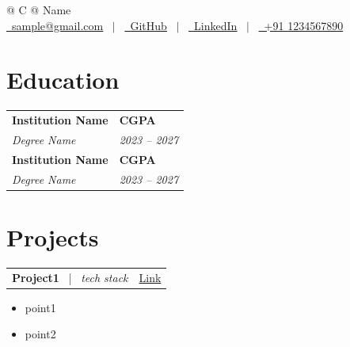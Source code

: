 \documentclass[a4paper,11pt]{article}
\begin{document}
\pagestyle{empty} 

\begin{tabularx}{\linewidth}{@{} C @{}}
\Huge{Name} \\[5pt]
\href{mailto:sample@gmail.com}{\raisebox{-0.05\height}\faEnvelope\ \underline{sample@gmail.com}} \ $|$ \
\href{https://github.com/sample}{\raisebox{-0.05\height}\faGithub\ \underline{GitHub}} \ $|$ \ 
\href{https://linkedin.com/in/sample}{\raisebox{-0.05\height}\faLinkedin\ \underline{LinkedIn}} \ $|$ \
\href{tel:+911234567890}{\raisebox{-0.05\height}\faMobile\ +91 1234567890} \\
\end{tabularx}

\section{Education}
\begin{tabularx}{\linewidth}{@{}l X@{}}	
\textbf{Institution Name} & \hfill \textbf{CGPA} \\
\textit{Degree Name} & \hfill \textit{2023 -- 2027} \\[2pt]
\textbf{Institution Name} & \hfill \textbf{CGPA} \\
\textit{Degree Name} & \hfill \textit{2023 -- 2027} \\[2pt]
\end{tabularx}

\section{Projects}

\begin{tabularx}{\linewidth}{@{}X r@{}}
\textbf{Project1} \ | \ \textit{tech stack}
    & \href{link}{\small Link} \\
\end{tabularx}
\vspace{-6pt}
\begin{itemize}[nosep, leftmargin=1em, itemsep=2pt]
    \item {point1}
    \item {point2}
\end{itemize}
\end{document}
